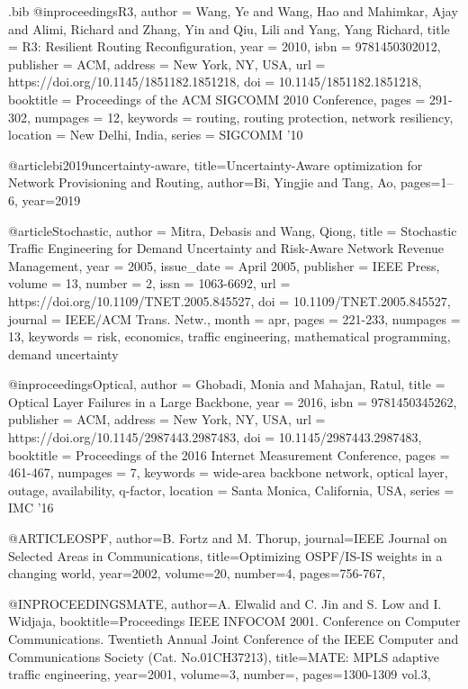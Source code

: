 \documentclass[sigconf]{acmart}
\begin{document}
\begin{filecontents}{\jobname.bib}
@inproceedings{R3, author = {Wang, Ye and Wang, Hao and Mahimkar, Ajay and Alimi, Richard and Zhang, Yin and Qiu, Lili and Yang, Yang Richard}, title = {R3: Resilient Routing Reconfiguration}, year = {2010}, isbn = {9781450302012}, publisher = {ACM}, address = {New York, NY, USA}, url = {https://doi.org/10.1145/1851182.1851218}, doi = {10.1145/1851182.1851218}, booktitle = {Proceedings of the ACM SIGCOMM 2010 Conference}, pages = {291-302}, numpages = {12}, keywords = {routing, routing protection, network resiliency}, location = {New Delhi, India}, series = {SIGCOMM '10} }






@article{bi2019uncertainty-aware,
title={Uncertainty-Aware optimization for Network Provisioning and Routing},
author={Bi, Yingjie and Tang, Ao},
pages={1--6},
year={2019}}
    
    
    
@article{Stochastic, author = {Mitra, Debasis and Wang, Qiong}, title = {Stochastic Traffic Engineering for Demand Uncertainty and Risk-Aware Network Revenue Management}, year = {2005}, issue_date = {April 2005}, publisher = {IEEE Press}, volume = {13}, number = {2}, issn = {1063-6692}, url = {https://doi.org/10.1109/TNET.2005.845527}, doi = {10.1109/TNET.2005.845527}, journal = {IEEE/ACM Trans. Netw.}, month = apr, pages = {221-233}, numpages = {13}, keywords = {risk, economics, traffic engineering, mathematical programming, demand uncertainty} }


@inproceedings{Optical, author = {Ghobadi, Monia and Mahajan, Ratul}, title = {Optical Layer Failures in a Large Backbone}, year = {2016}, isbn = {9781450345262}, publisher = {ACM}, address = {New York, NY, USA}, url = {https://doi.org/10.1145/2987443.2987483}, doi = {10.1145/2987443.2987483}, booktitle = {Proceedings of the 2016 Internet Measurement Conference}, pages = {461-467}, numpages = {7}, keywords = {wide-area backbone network, optical layer, outage, availability, q-factor}, location = {Santa Monica, California, USA}, series = {IMC '16} }



@ARTICLE{OSPF,
  author={B. {Fortz} and M. {Thorup}},
  journal={IEEE Journal on Selected Areas in Communications}, 
  title={Optimizing OSPF/IS-IS weights in a changing world}, 
  year={2002},
  volume={20},
  number={4},
  pages={756-767},}
  
  
@INPROCEEDINGS{MATE,
  author={A. {Elwalid} and C. {Jin} and S. {Low} and I. {Widjaja}},
  booktitle={Proceedings IEEE INFOCOM 2001. Conference on Computer Communications. Twentieth Annual Joint Conference of the IEEE Computer and Communications Society (Cat. No.01CH37213)}, 
  title={MATE: MPLS adaptive traffic engineering}, 
  year={2001},
  volume={3},
  number={},
  pages={1300-1309 vol.3},}
  

\end{filecontents}
\end{document}
